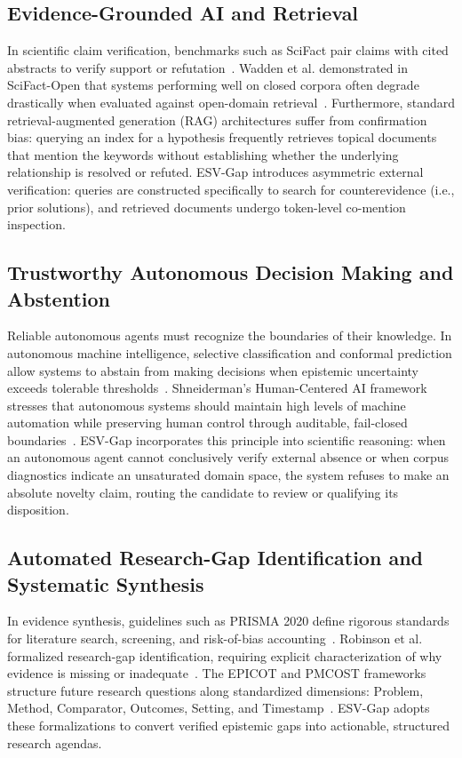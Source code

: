 \documentclass[conference,10pt]{IEEEtran}
\newcommand{\method}{ESV-Gap}
\begin{document}
\subsection{Evidence-Grounded AI and Retrieval}
In scientific claim verification, benchmarks such as SciFact pair claims with cited abstracts to verify support or refutation~\cite{wadden2020scifact}. Wadden et al. demonstrated in SciFact-Open that systems performing well on closed corpora often degrade drastically when evaluated against open-domain retrieval~\cite{wadden2022scifactopen}. Furthermore, standard retrieval-augmented generation (RAG) architectures suffer from confirmation bias: querying an index for a hypothesis frequently retrieves topical documents that mention the keywords without establishing whether the underlying relationship is resolved or refuted. \method{} introduces asymmetric external verification: queries are constructed specifically to search for counterevidence (i.e., prior solutions), and retrieved documents undergo token-level co-mention inspection.

\subsection{Trustworthy Autonomous Decision Making and Abstention}
Reliable autonomous agents must recognize the boundaries of their knowledge. In autonomous machine intelligence, selective classification and conformal prediction allow systems to abstain from making decisions when epistemic uncertainty exceeds tolerable thresholds~\cite{cortes2016learning,geifman2017selective}. Shneiderman's Human-Centered AI framework stresses that autonomous systems should maintain high levels of machine automation while preserving human control through auditable, fail-closed boundaries~\cite{shneiderman2020hcai}. \method{} incorporates this principle into scientific reasoning: when an autonomous agent cannot conclusively verify external absence or when corpus diagnostics indicate an unsaturated domain space, the system refuses to make an absolute novelty claim, routing the candidate to review or qualifying its disposition.

\subsection{Automated Research-Gap Identification and Systematic Synthesis}
In evidence synthesis, guidelines such as PRISMA 2020 define rigorous standards for literature search, screening, and risk-of-bias accounting~\cite{page2021prisma}. Robinson et al. formalized research-gap identification, requiring explicit characterization of why evidence is missing or inadequate~\cite{robinson2011development}. The EPICOT and PMCOST frameworks structure future research questions along standardized dimensions: Problem, Method, Comparator, Outcomes, Setting, and Timestamp~\cite{brown2006formulate}. \method{} adopts these formalizations to convert verified epistemic gaps into actionable, structured research agendas.
\end{document}
